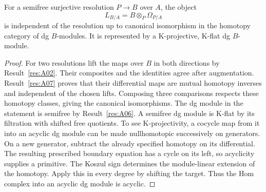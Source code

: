 \begin{theorem}\label{res:A08}
For a semifree surjective resolution \(P\to B\) over \(A\), the
object
\[
       L_{B/A}=B\otimes_P\Omega_{P/A}
\]
is independent of the resolution up to canonical isomorphism in
the homotopy category of dg \(B\)-modules. It is represented by
a K-projective, K-flat dg \(B\)-module.
\end{theorem}
\begin{proof}
For two resolutions lift the maps over \(B\) in both directions
by Result~\ref{res:A02}. Their composites and the identities
agree after augmentation. Result~\ref{res:A07} proves that their
differential maps are mutual homotopy inverses and independent
of the chosen lifts. Composing three comparisons respects these
homotopy classes, giving the canonical isomorphisms.
The dg module in the statement is semifree by
Result~\ref{res:A06}. A semifree dg module is K-flat by its
filtration with shifted free quotients. To see K-projectivity,
a cocycle map from it into an acyclic dg module can be made
nullhomotopic successively on generators. On a new generator,
subtract the already specified homotopy on its differential.
The resulting prescribed boundary equation has a cycle on
its left, so acyclicity supplies a primitive. The Koszul sign
determines the module-linear extension of the homotopy.
Apply this in every degree by shifting the target. Thus the
Hom complex into an acyclic dg module is acyclic.
\end{proof}

